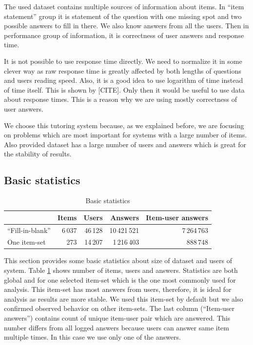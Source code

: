 \documentclass[
  digital, %
  table,   %
  nolof,     %
  nolot,     %
  nocover
]{fithesis3}
\begin{document}
The used dataset contains multiple sources of information about items. In ``item statement'' group it is statement of the question with one missing spot and two possible answers to fill in there. We also know answers from all the users. Then in performance group of information, it is correctness of user answers and response time.

It is not possible to use response time directly. We need to normalize it in some clever way as raw response time is greatly affected by both lengths of questions and users reading speed. Also, it is a good idea to use logarithm of time instead of time itself. This is shown by [CITE]. Only then it would be useful to use data about response times. This is a reason why we are using mostly correctness of user answers.


We choose this tutoring system because, as we explained before, we are focusing on problems which are most important for systems with a large number of items. Also provided dataset has a large number of users and answers which is great for the stability of results.

\subsection{Basic statistics}\label{basic-statistics}

\begin{table}
  \begin{tabular}{|l|r r r r|}
    \hline
     & Items & Users & Answers & Item-user answers \\
    \hline\hline
    ``Fill-in-blank'' & 6\,037 & 46\,128 & 10\,421\,521 & 7\,264\,763 \\
    \hline
    One item-set & 273 & 14\,207 & 1\,216\,403 & 888\,748 \\
    \hline
  \end{tabular}
  \caption{Basic statistics}
  \label{tab:basic-statistics}
\end{table}

This section provides some basic statistics about size of dataset and users of system. Table \ref{tab:basic-statistics} shows number of items, users and answers. Statistics are both global and for one selected item-set which is the one most commonly used for analysis. This item-set has most answers from users, therefore, it is ideal for analysis as results are more stable. We used this item-set by default but we also confirmed observed behavior on other item-sets. The last column (``Item-user answers'') contains count of unique item-user pair which are answered. This number differs from all logged answers because users can answer same item multiple times. In this case we use only one of the answers.
\end{document}

